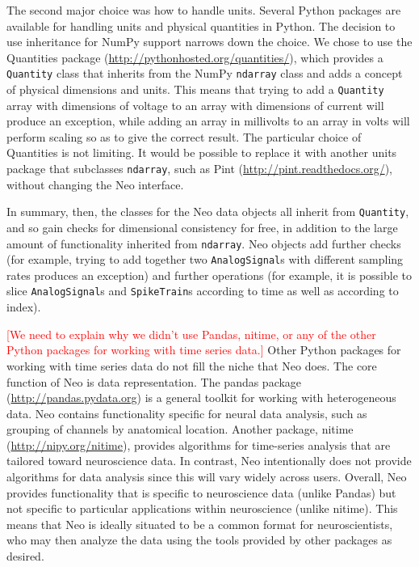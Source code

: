 \documentclass{frontiers}
\newcommand{\missing}[1]{\textcolor{red}{#1}}
\begin{document}
The second major choice was how to handle units.
Several Python packages are available for handling units and physical quantities in Python.
The decision to use inheritance for NumPy support narrows down the choice.
We chose to use the Quantities package (\url{http://pythonhosted.org/quantities/}), which provides a \lstinline`Quantity` class that inherits from the NumPy \lstinline`ndarray` class and adds a concept of physical dimensions and units.
This means that trying to add a \lstinline`Quantity` array with dimensions of voltage to an array with dimensions of current will produce an exception, while adding an array in millivolts to an array in volts will perform scaling so as to give the correct result.
The particular choice of Quantities is not limiting.
It would be possible to replace it with another units package that subclasses \lstinline`ndarray`, such as Pint (\url{http://pint.readthedocs.org/}), without changing the Neo interface.

In summary, then, the classes for the Neo data objects all inherit from \lstinline`Quantity`, and so gain checks for dimensional consistency for free, in addition to the large amount of functionality inherited from \lstinline`ndarray`.
Neo objects add further checks (for example, trying to add together two \lstinline`AnalogSignal`s with different sampling rates produces an exception) and further operations (for example, it is possible to slice \lstinline`AnalogSignal`s and \lstinline`SpikeTrain`s according to time as well as according to index).

\missing{[We need to explain why we didn't use Pandas, nitime, or any of the other Python packages for working with time series data.]}
Other Python packages for working with time series data do not fill the niche that Neo does. 
The core function of Neo is data representation. 
The pandas package (\url{http://pandas.pydata.org}) is a general toolkit for working with heterogeneous data. 
Neo contains functionality specific for neural data analysis, such as grouping of channels by anatomical location.
Another package, nitime (\url{http://nipy.org/nitime}), provides algorithms for time-series analysis that are tailored toward neuroscience data.
In contrast, Neo intentionally does not provide algorithms for data analysis since this will vary widely across users.
Overall, Neo provides functionality that is specific to neuroscience data (unlike Pandas) but not specific to particular applications within neuroscience (unlike nitime).
This means that Neo is ideally situated to be a common format for neuroscientists, who may then analyze the data using the tools provided by other packages as desired.
\end{document}
